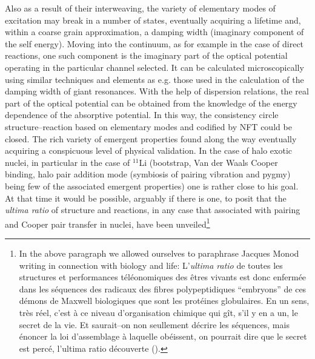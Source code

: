 \begin{subappendices}
Also as a result of their interweaving,  the variety of elementary modes of excitation may break in a number of states, eventually acquiring a lifetime and, within a coarse grain approximation, a damping width (imaginary component of the self energy). Moving into the continuum, as for example in the case of direct reactions, one such component is the imaginary part of the optical potential operating in the particular channel selected. It can be calculated microscopically using similar techniques and elements as e.g. those used in the calculation of the damping width of giant resonances. With the help of dispersion relations, the real part of the optical potential can be obtained from the knowledge of the energy dependence of the absorptive potential. In this way, the consistency circle structure--reaction based on elementary modes and codified by NFT could be closed. The rich variety of emergent properties found along the way eventually acquiring a conspicuous level of physical validation. In the case of halo exotic nuclei, in particular in the case of $^{11}$Li (bootstrap, Van der Waals Cooper binding, halo pair addition mode (symbiosis of pairing vibration and pygmy) being few of the associated emergent properties) one is rather close to his goal. At that time it would be possible, arguably if there is one, to posit that the \textit{ultima ratio} of structure and reactions, in any case that associated with pairing and Cooper pair transfer in nuclei, have been unveiled\footnote{In the above paragraph we allowed ourselves to paraphrase Jacques Monod writing in connection with biology and life: L'\textit{ultima ratio} de toutes les structures et performances t\'el\'eonomiques des \^etres vivants est donc enferm\'ee dans les s\'equences des radicaux des fibres polypeptidiques ``embryons'' de ces d\'emons de Maxwell biologiques que sont les prot\'eines globulaires. En un sens, tr\`{e}s r\'{e}el, c'est \`a ce niveau d'organisation chimique qui g\^it, s'il y en a un, le secret de la vie. Et saurait--on non seullement d\'ecrire les s\'equences, mais \'enoncer la loi d'assemblage \`a laquelle ob\'eissent, on pourrait dire que le secret est perc\'e, l'ultima ratio d\'ecouverte (\cite{Monod:70}).}

\end{subappendices}
